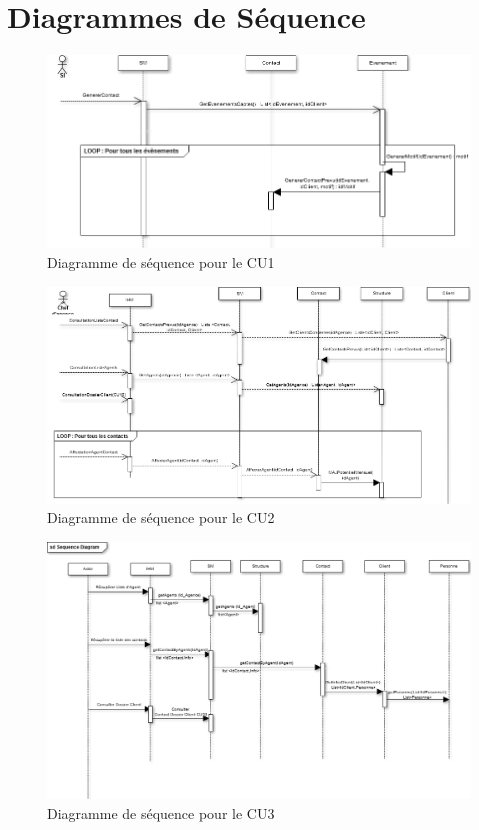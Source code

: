 \section{Diagrammes de Séquence}

\begin{figure}[H]
	\begin{center}
		\includegraphics[scale=0.4]{Includes/SOA-Sequence-CU1.png}
		\caption{Diagramme de séquence pour le CU1}
	\end{center}
\end{figure}

\begin{figure}[H]
	\begin{center}
		\includegraphics[scale=0.4]{Includes/SOA-Sequence-CU2.png}
		\caption{Diagramme de séquence pour le CU2}
	\end{center}
\end{figure}

\begin{figure}[H]
	\begin{center}
		\includegraphics[scale=0.4]{Includes/SOA-Sequence-CU3.png}
		\caption{Diagramme de séquence pour le CU3}
	\end{center}
\end{figure}

